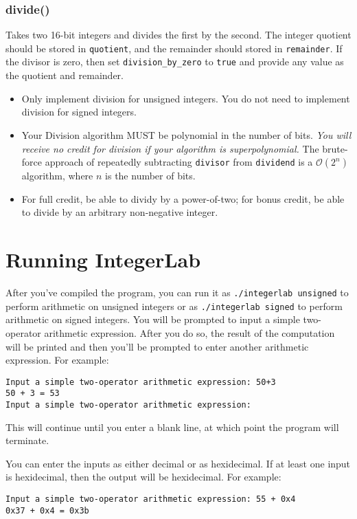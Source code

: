 \subsubsection*{divide()}  Takes two 16-bit integers and divides the first by
the second.  The integer quotient should be stored in \lstinline{quotient}, and
the remainder should stored in \lstinline{remainder}.  If the divisor is zero,
then set \lstinline{division_by_zero} to \lstinline{true} and provide any value
as the quotient and remainder.
\begin{itemize}
\item Only implement division for unsigned integers.  You do not need to
    implement division for signed integers.
\item Your Division algorithm MUST be polynomial in the number of bits.
    \textit{You will receive no credit for division if your algorithm is
    superpolynomial.} The brute-force approach of repeatedly subtracting
    \lstinline{divisor} from \lstinline{dividend} is a $\mathcal{O}(2^n)$
    algorithm, where $n$ is the number of bits.
\item For full credit, be able to dividy by a power-of-two; for bonus credit,
    be able to divide by an arbitrary non-negative integer.
\end{itemize}


\section{Running IntegerLab}

After you've compiled the program, you can run it as
\texttt{./integerlab~unsigned} to perform arithmetic on unsigned integers or as
\texttt{./integerlab~signed} to perform arithmetic on signed integers.  You
will be prompted to input a simple two-operator arithmetic expression.  After
you do so, the result of the computation will be printed and then you'll be
prompted to enter another arithmetic expression.  For example:
\begin{verbatim}
Input a simple two-operator arithmetic expression: 50+3
50 + 3 = 53
Input a simple two-operator arithmetic expression:
\end{verbatim}
This will continue until you enter a blank line, at which point the program
will terminate.

You can enter the inputs as either decimal or as hexidecimal.  If at least one
input is hexidecimal, then the output will be hexidecimal.  For example:
\begin{verbatim}
Input a simple two-operator arithmetic expression: 55 + 0x4
0x37 + 0x4 = 0x3b
\end{verbatim}


